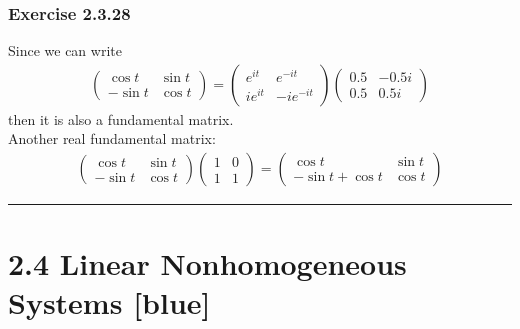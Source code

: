 \documentclass[12pt, letterpaper]{scrartcl}
\begin{document}
\subsubsection*{Exercise 2.3.28}
Since we can write
\begin{align*}
    \left( \begin{array}{cc} \cos t & \sin t \\ -\sin t & \cos t \end{array}\right)=
    \left( \begin{array}{cc} e^{it} & e^{-it} \\ ie^{it} & -ie^{-it} \end{array}\right)
    \left( \begin{array}{cc} 0.5 & -0.5i \\ 0.5 & 0.5i \end{array}\right)
\end{align*}
then it is also a fundamental matrix.\\
Another real fundamental matrix:
\begin{align*}
    \left( \begin{array}{cc} \cos t & \sin t \\ -\sin t & \cos t \end{array}\right)
    \left( \begin{array}{cc} 1 & 0 \\ 1 & 1 \end{array}\right)=
    \left( \begin{array}{cc} \cos t & \sin t \\ -\sin t + \cos t & \cos t \end{array}\right)
\end{align*}
\vskip1mm\hrule
\clearpage


\section*{2.4 Linear Nonhomogeneous Systems \xrfill[2pt]{3pt}[blue]}
\end{document}
